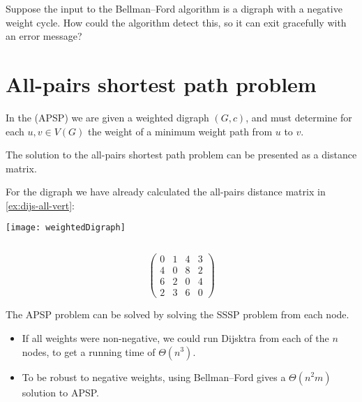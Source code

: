 \begin{Boxample}[4]\label{ex:bellman-neg-cycle}
Suppose the input to the Bellman--Ford algorithm is a digraph with a
negative weight cycle. How could the algorithm detect this, so it can
exit gracefully with an error message?
\end{Boxample}




\chapter{All-pairs shortest path problem} %
\label{sec:APSP}

\begin{Definition}
In the  (APSP) we are given a weighted digraph $(G, c)$, 
and must determine for each $u, v\in V(G)$ the weight of a minimum weight path from $u$ to $v$.
\end{Definition}
The solution to the all-pairs shortest path problem can be presented as a distance matrix.

\begin{Boxample}[0] \label{eg:APSP}
For the digraph we have already
calculated the all-pairs distance matrix in \cref{ex:dijs-all-vert}:\\

  \begin{minipage}[c]{0.45\textwidth}
  \begin{center}
	\texttt{[image: weightedDigraph]}
  \end{center}
  \end{minipage}$\quad$
  \begin{minipage}[c]{0.45\textwidth}
	$$ \left(
	\begin{matrix}
	0 & 1 & 4 & 3 \\
	4 & 0 & 8 & 2 \\
	6 & 2 & 0 & 4 \\
	2 & 3 & 6 & 0
	\end{matrix}
	\right)$$
  \end{minipage}
\end{Boxample}

The APSP problem can be solved by solving the SSSP problem from each node.
\begin{itemize}
  \item If all weights were non-negative, we could run Dijsktra from each of the $n$ nodes, to get a running time of $\Theta(n^3)$.
  \item To be robust to negative weights, using Bellman--Ford gives a $\Theta(n^2 m)$ solution to APSP.
\end{itemize}

